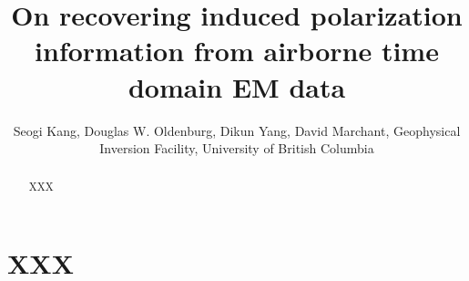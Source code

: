 \documentclass{segabs}
\begin{document}
\title{On recovering induced polarization information from airborne time domain EM data}

\renewcommand{\thefootnote}{\fnsymbol{footnote}}

\author{Seogi Kang\footnotemark[1], Douglas W. Oldenburg, Dikun Yang, David Marchant, Geophysical Inversion Facility, University of British Columbia}


\maketitle
\begin{abstract}
XXX
\end{abstract}
\renewcommand{\figdir}{Fig} %

\section{XXX}

\cite{seigel1959}
\cite{doug1994}
\cite{Wynn1975}
\cite{Smith1988a}
\cite{Marchant2014}
\cite{Flis1989}
\cite{Pelton1978}
\cite{Kang2016}
\cite{Weidelt1982}


\end{document}
